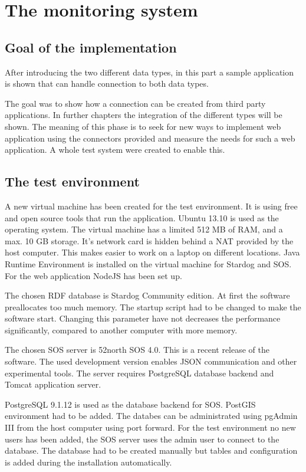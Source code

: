 \chapter{The monitoring system}
\section{Goal of the implementation}

After introducing the two different data types, in this part a sample application is shown that can handle connection to both data types.

The goal was to show how a connection can be created from third party applications. In further chapters the integration of the different types will be shown. The meaning of this phase is to seek for new ways to implement web application using the connectors provided and measure the needs for such a web application. A whole test system were created to enable this.

\section{The test environment}

A new virtual machine has been created for the test environment. It is using free and open source tools that run the application.
Ubuntu 13.10 is used as the operating system. The virtual machine has a limited 512 MB of RAM, and a max. 10 GB storage. It's network card is hidden behind a NAT provided by the host computer. This makes easier to work on a laptop on different locations. Java Runtime Environment is installed on the virtual machine for Stardog and SOS. For the web application NodeJS has been set up.

The chosen RDF database is Stardog Community edition. At first the software preallocates too much memory. The startup script had to be changed to make the software start. Changing this parameter have not decreases the performance significantly, compared to another computer with more memory. 

The chosen SOS server is 52north SOS 4.0. This is a recent release of the software. The used development version enables JSON communication and other experimental tools. The server requires PostgreSQL database backend and Tomcat application server.

PostgreSQL 9.1.12 is used as the database backend for SOS. PostGIS environment had to be added. The databes can be administrated using pgAdmin III from the host computer using port forward. For the test environment no new users has been added, the SOS server uses the admin user to connect to the database. The database had to be created manually but tables and configuration is added during the installation automatically.

